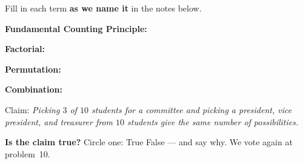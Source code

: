\documentclass[12pt]{article}
\newcommand{\termrowheight}{2.3cm}
\newlength{\termrowinset}\setlength{\termrowinset}{7pt}
\newcommand{\vterm}[1]{%
  \par\noindent\begin{minipage}[t][\termrowheight][t]{\linewidth}%
    \vspace*{\termrowinset}%
    \textbf{\textcolor{cerulean}{#1:}}%
  \end{minipage}\par}
\begin{document}

\vspace{0.15in}

\boxguard[16]
\begin{vocabbox}
\small
Fill in each term \textbf{as we name it} in the notes below.
\vterm{Fundamental Counting Principle}
\vterm{Factorial}
\vterm{Permutation}
\vterm{Combination}
\end{vocabbox}

\boxguard[12]
\begin{hookbox}
\small
Claim: \emph{Picking $3$ of $10$ students for a committee and picking a president, vice
president, and treasurer from $10$ students give the same number of possibilities.}

\vspace{3pt}
\textbf{Is the claim true?} Circle one: \quad True \qquad False \quad --- and say why. We vote
again at problem~10.
\par{}
\end{hookbox}
\end{document}
